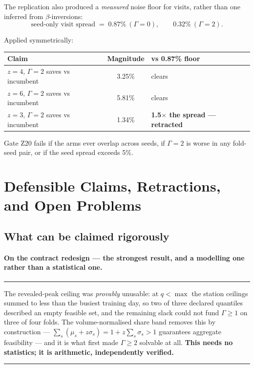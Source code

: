 \documentclass[11pt,a4paper]{article}
\newenvironment{keybox}
  {\par\medskip\noindent\rule{\linewidth}{0.9pt}\par\nobreak\smallskip\ignorespaces}
  {\par\smallskip\nobreak\noindent\rule{\linewidth}{0.9pt}\par\medskip}
\begin{document}
The replication also produced a \emph{measured} noise floor for visits, rather
than one inferred from $\beta$-inversions:
\[
  \text{seed-only visit spread} \;=\; 0.87\%\ (\Gamma{=}0),
  \qquad 0.32\%\ (\Gamma{=}2).
\]

Applied symmetrically:

\begin{center}
\begin{tabular}{lcl}
\toprule
Claim & Magnitude & vs 0.87\% floor \\
\midrule
$z=4$, $\Gamma{=}2$ saves vs incumbent & 3.25\% & clears \\
$z=6$, $\Gamma{=}2$ saves vs incumbent & 5.81\% & clears \\
$z=3$, $\Gamma{=}2$ saves vs incumbent & 1.34\% & \textbf{1.5$\times$ the spread --- retracted} \\
\bottomrule
\end{tabular}
\end{center}

Gate Z20 fails if the arms ever overlap across seeds, if $\Gamma=2$ is worse in
any fold-seed pair, or if the seed spread exceeds 5\%.

\section{Defensible Claims, Retractions, and Open Problems}

\subsection{What can be claimed rigorously}

\paragraph{On the contract redesign --- the strongest result, and a modelling
one rather than a statistical one.}

\begin{keybox}
The revealed-peak ceiling was \emph{provably} unusable: at $q<\max$ the station
ceilings summed to less than the busiest training day, so two of three declared
quantiles described an empty feasible set, and the remaining slack could not
fund $\Gamma\ge1$ on three of four folds. The volume-normalised share band
removes this by construction --- $\sum_s(\mu_s+z\sigma_s)=1+z\sum_s\sigma_s>1$
guarantees aggregate feasibility --- and it is what first made $\Gamma\ge2$
solvable at all. \textbf{This needs no statistics; it is arithmetic,
independently verified.}
\end{keybox}
\end{document}
